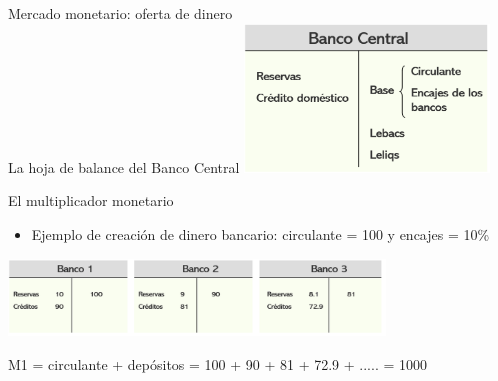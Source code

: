\documentclass{beamer}
\begin{document}
\begin{frame}{Mercado monetario: oferta de dinero \\ La hoja de balance del Banco Central }
\centering\includegraphics[width=6.5cm]{Slides Principios de Economia/Figures/P48.png}\
\end{frame}


\begin{frame}{El multiplicador monetario}
    \begin{itemize}
        \item Ejemplo de creación de dinero bancario:  circulante = 100  y  encajes = 10\%
    \end{itemize}

    \vspace{2mm}
    
    \centering\includegraphics[width=10cm]{Slides Principios de Economia/Figures/P50.png}\
    
    \vspace{2mm}
    
    \begin{tcolorbox}[width=4in, interior hidden, boxsep=0pt,
                  left=0pt, halign=center, valign=center, right=0pt,
                  bottom=3pt, top=3pt, ]%
                 \footnotesize{M1 = circulante + depósitos = 100 + 90 + 81 + 72.9 + ..... = 1000}
    \end{tcolorbox}
    \vspace{2mm}
\end{frame}
\end{document}
